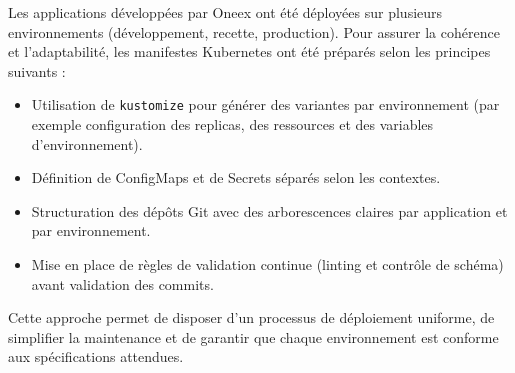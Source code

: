 Les applications développées par Oneex ont été déployées sur plusieurs environnements (développement, recette, production).
Pour assurer la cohérence et l’adaptabilité, les manifestes Kubernetes ont été préparés selon les principes suivants :
\begin{itemize}
	\item Utilisation de \texttt{kustomize} pour générer des variantes par environnement (par exemple configuration des replicas, des ressources et des variables d’environnement).
	\item Définition de ConfigMaps et de Secrets séparés selon les contextes.
	\item Structuration des dépôts Git avec des arborescences claires par application et par environnement.
	\item Mise en place de règles de validation continue (linting et contrôle de schéma) avant validation des commits.
\end{itemize}

Cette approche permet de disposer d’un processus de déploiement uniforme, de simplifier la maintenance et de garantir que chaque environnement est conforme aux spécifications attendues.
